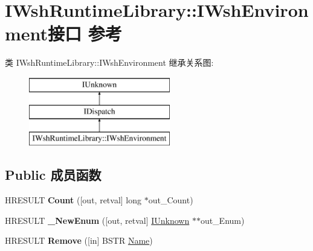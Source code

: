 \hypertarget{interface_i_wsh_runtime_library_1_1_i_wsh_environment}{}\section{I\+Wsh\+Runtime\+Library\+:\+:I\+Wsh\+Environment接口 参考}
\label{interface_i_wsh_runtime_library_1_1_i_wsh_environment}
类 I\+Wsh\+Runtime\+Library\+:\+:I\+Wsh\+Environment 继承关系图\+:\begin{figure}[H]
\begin{center}
\leavevmode
\includegraphics[height=3.000000cm]{interface_i_wsh_runtime_library_1_1_i_wsh_environment}
\end{center}
\end{figure}
\subsection*{Public 成员函数}
\begin{DoxyCompactItemize}
\item 
\mbox{\label{interface_i_wsh_runtime_library_1_1_i_wsh_environment_accfb2665abb99d234b5fd20b1a6bc437}} 
H\+R\+E\+S\+U\+LT {\bfseries Count} (\mbox{[}out, retval\mbox{]} long $\ast$out\+\_\+\+Count)
\item 
\mbox{\label{interface_i_wsh_runtime_library_1_1_i_wsh_environment_a43d56b43a289d1449108c7ff4f44fe02}} 
H\+R\+E\+S\+U\+LT {\bfseries \+\_\+\+New\+Enum} (\mbox{[}out, retval\mbox{]} \hyperlink{interface_i_unknown}{I\+Unknown} $\ast$$\ast$out\+\_\+\+Enum)
\item 
\mbox{\label{interface_i_wsh_runtime_library_1_1_i_wsh_environment_a3a74458b6195b34668646bd545a23249}} 
H\+R\+E\+S\+U\+LT {\bfseries Remove} (\mbox{[}in\mbox{]} B\+S\+TR \hyperlink{struct_name_rec__}{Name})
\end{DoxyCompactItemize}
